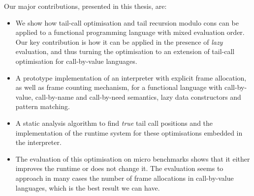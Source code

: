 \documentclass[diploma]{softlab-thesis}
\begin{document}
Our major contributions, presented in this thesis, are:
\begin{itemize}
  \item We show how tail-call optimisation and tail recursion modulo cons can be applied to a functional programming 
  language with mixed evaluation order. Our key contribution is how it can be applied in 
  the presence of \textit{lazy} evaluation, and thus turning the optimisation to an extension of tail-call optimisation 
  for call-by-value languages.
  \item A prototype implementation of an interpreter with explicit frame allocation, as well as frame counting mechanism,
  for a functional language with call-by-value, call-by-name and call-by-need semantics, lazy data constructors 
  and pattern matching.
  \item A static analysis algorithm to find \textit{true} tail call positions and the implementation of the runtime system 
  for these optimisations embedded in the interpreter.
  \item The evaluation of this optimisation on micro benchmarks shows that it either improves the runtime 
  or does not change it. The evaluation seems to approach in many cases the number of frame allocations in call-by-value languages, 
  which is the best result we can have.
\end{itemize}
\end{document}
